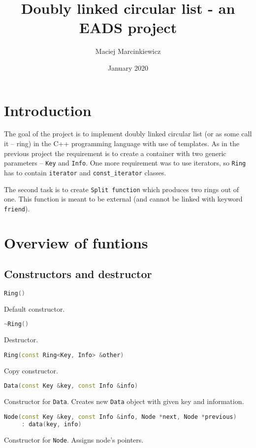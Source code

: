 \documentclass{article}
\title{Doubly linked circular list - an EADS project}
\author{Maciej Marcinkiewicz}
\date{January 2020}
\begin{document}
\maketitle

\section{Introduction}

The goal of the project is to implement doubly linked circular list (or as some call
it – ring) in the C++ programming language with use of templates. As in the previous 
project the requirement is to create a container with two generic parameters – {\tt Key}
and {\tt Info}. One more requirement was to use iterators, so {\tt Ring} has to contain
{\tt iterator} and {\tt const\_iterator} classes.

\indent
The second task is to create {\tt Split function} which produces two rings out of one.
This function is meant to be external (and cannot be linked with keyword {\tt friend}).

\section{Overview of funtions}

\subsection{Constructors and destructor}

\begin{lstlisting}[language=C++]
Ring()
\end{lstlisting}
Default constructor.

\begin{lstlisting}[language=C++]
~Ring()
\end{lstlisting}
Destructor.

\begin{lstlisting}[language=C++]
Ring(const Ring<Key, Info> &other)
\end{lstlisting}
Copy constructor.

\begin{lstlisting}[language=C++]
Data(const Key &key, const Info &info)
\end{lstlisting}
Constructor for {\tt Data}. Creates new {\tt Data} object with given key and information.

\begin{lstlisting}[language=C++]
Node(const Key &key, const Info &info, Node *next, Node *previous)
     : data(key, info)
\end{lstlisting}
Constructor for {\tt Node}. Assigns node's pointers.
\end{document}
